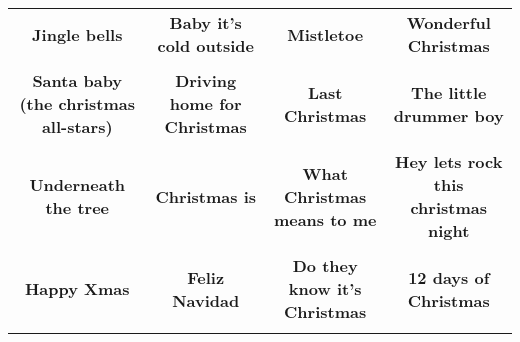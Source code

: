\documentclass[12pt]{article} \usepackage{eso-pic, graphicx}
\newcommand{\background}[1]{%
\AddToShipoutPictureBG*{\texttt{[image: \#1]}}
}
\begin{document}
\tabcolsep=30.2pt \renewcommand{\arraystretch}{4.5}   \vspace*{4.3cm} \begin{center}  \begin{tabular}{c c c c}
\parbox{3cm}{\centering \textbf{Jingle bells}}& 
\parbox{3cm}{\centering \textbf{Baby it’s cold outside}}& 
\parbox{3cm}{\centering \textbf{Mistletoe}}& 
\parbox{3cm}{\centering \textbf{Wonderful Christmas}}\\ \\ 
\parbox{3cm}{\centering \textbf{Santa baby (the christmas all-stars)}}& 
\parbox{3cm}{\centering \textbf{Driving home for Christmas}}& 
\parbox{3cm}{\centering \textbf{Last Christmas}}& 
\parbox{3cm}{\centering \textbf{The little drummer boy}}\\ \\ 
\parbox{3cm}{\centering \textbf{Underneath the tree}}& 
\parbox{3cm}{\centering \textbf{Christmas is}}& 
\parbox{3cm}{\centering \textbf{What Christmas means to me}}& 
\parbox{3cm}{\centering \textbf{Hey lets rock this christmas night}}\\ \\ 
\parbox{3cm}{\centering \textbf{Happy Xmas}}& 
\parbox{3cm}{\centering \textbf{Feliz Navidad}}& 
\parbox{3cm}{\centering \textbf{Do they know it's Christmas}}& 
\parbox{3cm}{\centering \textbf{12 days of Christmas}}\\ \\ 
\end{tabular} \background{discobingo.pdf} \end{center} 
\end{document}
